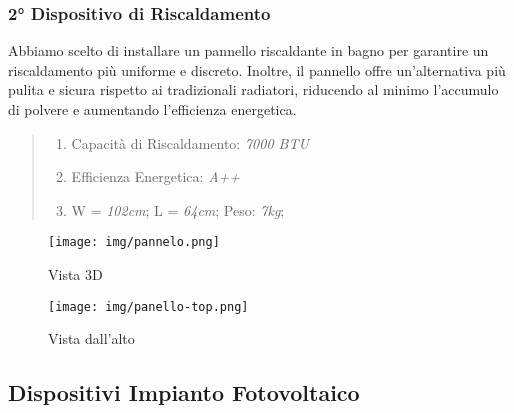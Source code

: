 \documentclass[italian, 12pt, a4paper]{article}
\begin{document}
\subsubsection{2° Dispositivo di Riscaldamento}
Abbiamo scelto di installare un pannello riscaldante in bagno per garantire un riscaldamento più uniforme e discreto. Inoltre, il pannello offre un'alternativa più pulita e sicura rispetto ai tradizionali radiatori, riducendo al minimo l'accumulo di polvere e aumentando l'efficienza energetica.
\begin{quote}
    \begin{enumerate}
        \item Capacità di Riscaldamento: \emph{7000 BTU}
        \item Efficienza Energetica: \emph{A++}
        \item W = \emph{102cm}; L = \emph{64cm}; Peso: \emph{7kg}; 
    \end{enumerate}
\end{quote}
\vspace{-15px}
\begin{figure}[h]
    \centering
    \begin{minipage}{0.45\textwidth}
        \centering
        \texttt{[image: img/pannelo.png]} %
        \caption{Vista 3D}
    \end{minipage} \hfill
    \begin{minipage}{0.45\textwidth}
        \centering
        \texttt{[image: img/panello-top.png]} %
        \caption{Vista dall'alto}
    \end{minipage}
\end{figure}
\clearpage
\subsection{Dispositivi Impianto Fotovoltaico}
\end{document}
